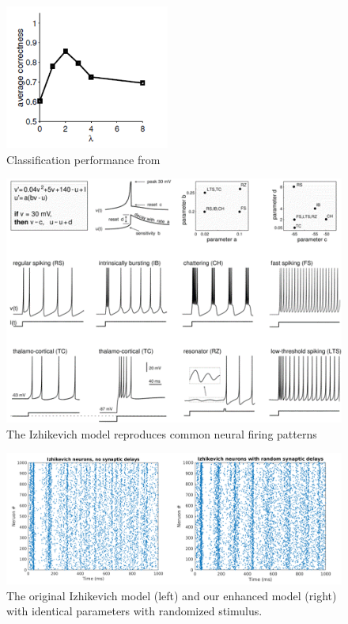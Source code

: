 \documentclass[a4paper,11pt]{article}
\begin{document}
\begin{figure}[p]
  \caption{Classification performance from \cite{maas2002}}
  \label{fig:lambda_performance}
  \centering
    \includegraphics[width=0.48\textwidth]{fig/lambda_performance}
\end{figure}

\begin{figure}[p]
 \caption{The Izhikevich model reproduces common neural firing patterns \cite{izhikevich2003}}
 \label{fig:izzy_model}
 \centering
   \includegraphics[width=\textwidth]{fig/izzy_model}
\end{figure}

\begin{figure}[p]
 \caption{The original Izhikevich model (left) and our enhanced model (right) with identical parameters with randomized stimulus.}
 \label{fig:izzy_enhanced}
 \centering
   \includegraphics[width=\textwidth]{fig/izzy_enhanced}
\end{figure}
\end{document}
